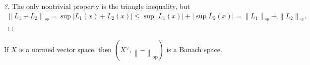 \begin{proof}[?]

The only nontrivial property is the triangle inequality, but
\begin{align*}
{\left\lVert {L_{1} + L_{2}} \right\rVert}_{^{\operatorname{op}}} = \sup {\left\lvert {L_{1}(x) + L_{2}(x)} \right\rvert} \leq \sup {\left\lvert {L_{1}(x)} \right\rvert} + {\left\lvert {\sup L_{2}(x)} \right\rvert} = {\left\lVert {L_{1}} \right\rVert}_{^{\operatorname{op}}}+ {\left\lVert {L_{2}} \right\rVert}_{^{\operatorname{op}}}
.\end{align*}

\end{proof}

\begin{theorem}

If \(X\) is a normed vector space, then
\((X {}^{ \vee }, {\left\lVert {{-}} \right\rVert}_{\text{op}})\) is a
Banach space.

\end{theorem}

